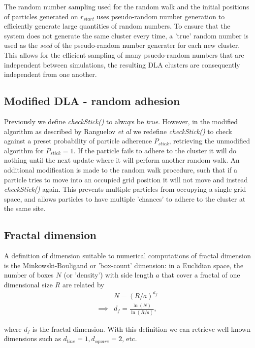 \documentclass[10pt, twocolumn]{article} %
\begin{document}
  The random number sampling used for the random walk and the initial positions of particles generated on $r_{start}$ uses pseudo-random number generation to efficiently generate large quantities of random numbers. To ensure that the system does not generate the same cluster every time, a 'true' random number is used as the \textit{seed} of the pseudo-random number generater for each new cluster. This allows for the efficient sampling of many psuedo-random numbers that are independent between simulations, the resulting DLA clusters are consequently independent from one another.

\subsection*{Modified DLA - random adhesion}
  Previously we define \textit{checkStick()} to always be \textit{true}. However, in the modified algorithm as described by Ranguelov \textit{et al} \cite{Ranguelov_2011} we redefine \textit{checkStick()} to check against a preset probability of particle adherence $P_{stick}$, retrieving the unmodified algorithm for $P_{stick} = 1$. If the particle fails to adhere to the cluster it will do nothing until the next update where it will perform another random walk. An additional modification is made to the random walk procedure, such that if a particle tries to move into an occupied grid position it will not move and instead \textit{checkStick()} again. This prevents multiple particles from occupying a single grid space, and allows particles to have multiple 'chances' to adhere to the cluster at the same site.

\subsection*{Fractal dimension}
  A definition of dimension suitable to numerical computations of fractal dimension is the Minkowski-Bouligand or 'box-count' dimension: in a Euclidian space, the number of boxes $N$ (or 'density') with side length $a$ that cover a fractal of one dimensional size $R$ are related by
  \begin{equation}
      \begin{aligned}
        & N = (R/a)^{d_f}\\
        \implies & d_f = \frac{\ln(N)}{\ln(R/a)},
      \end{aligned}
      \label{dim_definition}
  \end{equation}

  where $d_f$ is the fractal dimension. With this definition we can retrieve well known dimensions such as $d_{line} = 1, d_{square} = 2$, etc.
\end{document}
